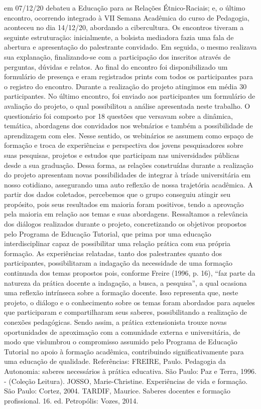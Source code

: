 em 07/12/20 debateu a Educação para as Relações Étnico-Raciais; e, o último encontro,
ocorrendo integrado à VII Semana Acadêmica do curso de Pedagogia, aconteceu no dia
14/12/20, abordando a cibercultura.
Os encontros tiveram a seguinte estruturação: inicialmente, a bolsista mediadora fazia
uma fala de abertura e apresentação do palestrante convidado. Em seguida, o mesmo realizava
sua explanação, finalizando-se com a participação dos inscritos através de perguntas, dúvidas e
relatos. Ao final do encontro foi disponibilizado um formulário de presença e eram registrados
prints com todos os participantes para o registro do encontro. Durante a realização do projeto
atingimos em média 30 participantes. No último encontro, foi enviado aos participantes um
formulário de avaliação do projeto, o qual possibilitou a análise apresentada neste trabalho. O
questionário foi composto por 18 questões que versavam sobre a dinâmica, temática, abordagens
dos convidados nos webnários e também a possibilidade de aprendizagem com eles.
Nesse sentido, os webinários se assumem como espaço de formação e troca de
experiências e perspectiva dos jovens pesquisadores sobre suas pesquisas, projetos e estudos que
participam nas universidades públicas desde a sua graduação. Dessa forma, as relações
construídas durante a realização do projeto apresentam novas possibilidades de integrar à tríade
universitária em nosso cotidiano, assegurando uma auto reflexão de nossa trajetória acadêmica.
A partir dos dados coletados, percebemos que o grupo conseguiu atingir seu propósito, pois seus
resultados em maioria foram positivos, tendo a aprovação pela maioria em relação aos temas e
suas abordagens.
Ressaltamos a relevância dos diálogos realizados durante o projeto, concretizando os
objetivos propostos pelo Programa de Educação Tutorial, que prima por uma educação
interdisciplinar capaz de possibilitar uma relação prática com sua própria formação. As
experiências relatadas, tanto dos palestrantes quanto dos participantes, possibilitaram a
indagação da necessidade de uma formação continuada dos temas propostos pois, conforme
Freire (1996, p. 16), “faz parte da natureza da prática docente a indagação, a busca, a pesquisa”,
a qual ocasiona uma reflexão intrínseca sobre a formação docente. Isso representa que, neste
projeto, o diálogo e o conhecimento sobre os temas foram abordados para aqueles que
participaram e compartilharam seus saberes, possibilitando a realização de conexões
pedagógicas.
Sendo assim, a prática extensionista trouxe novas oportunidades de aproximação com a
comunidade externa e universitária, de modo que vislumbrou o compromisso assumido pelo
Programa de Educação Tutorial no apoio à formação acadêmica, contribuindo significativamente
para uma educação de qualidade.
Referências:
FREIRE, Paulo. Pedagogia da Autonomia: saberes necessários à prática educativa. São Paulo:
Paz e Terra, 1996. - (Coleção Leitura).
JOSSO, Marie-Christine. Experiências de vida e formação. São Paulo: Cortez, 2004.
TARDIF, Maurice. Saberes docentes e formação profissional. 16. ed. Petropólis: Vozes, 2014.

